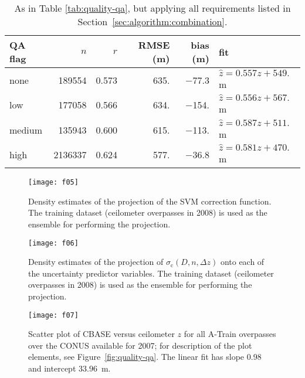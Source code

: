\documentclass[essd,manuscript]{copernicus}
\begin{document}
\begin{table*}
  \centering
  \caption{As in Table \ref{tab:quality-qa}, but applying all 
    requirements listed in Section~\ref{sec:algorithm:combination}.}
  \label{tab:quality-qa-other-cuts}
\begin{tabular}{lrrrrl}
  \hline
\hline
QA flag & $n$ & $r$ & RMSE (m) & bias (m) & fit \\ 
  \hline
none & 189554 & 0.573 & 635. & $-$77.3 & $\hat{z} = 0.557 z + 549.$ m \\ 
  low & 177058 & 0.566 & 634. & $-$154. & $\hat{z} = 0.556 z + 567.$ m \\ 
  medium & 135943 & 0.600 & 615. & $-$113. & $\hat{z} = 0.587 z + 511.$ m \\ 
  high & 2136337 & 0.624 & 577. & $-$36.8 & $\hat{z} = 0.581 z + 470.$ m \\ 
   \hline
\hline
\end{tabular}

\end{table*}

\begin{figure*}
{\centering \texttt{[image: f05]}

}
  \caption{Density estimates of the projection of the SVM correction function.
    The training dataset (ceilometer overpasses in 2008) is used as the ensemble
    for performing the projection.}
  \label{fig:svm-correction}
\end{figure*}

\begin{figure*}
{\centering \texttt{[image: f06]}

}
  \caption{Density estimates of the projection of
    $\ensuremath{\sigma_\text{c}}(D, n, \Delta z)$ onto each of the uncertainty
    predictor variables.  The training dataset (ceilometer overpasses in 2008)
    is used as the ensemble for performing the projection.}
  \label{fig:eval-uncertainty}
\end{figure*}

\begin{figure*}
{\centering \texttt{[image: f07]}

}
  \caption{Scatter plot of CBASE versus ceilometer \ensuremath{z}{} for all A-Train
    overpasses over the CONUS available for 2007; for description of the
  plot elements, see Figure~\ref{fig:quality-qa}.  The linear fit has slope
  0.98 and intercept $33.96$~\unit{m}.}
  \label{fig:eval}
\end{figure*}
\end{document}
